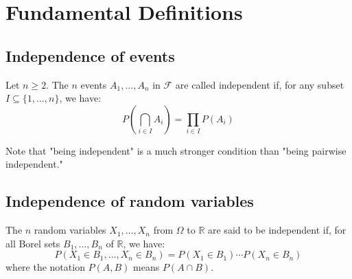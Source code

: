 \section{Fundamental Definitions}%
\subsection{Independence of events}%
\begin{definition}
Let $n \ge 2$. The $n$ events $A_1, \ldots, A_n$ in $\mathcal{F}$ are called independent if, for any subset $I \subseteq \{1, \ldots, n\}$, we have:
\[ P\left(\bigcap_{i \in I} A_i\right) = \prod_{i \in I} P(A_i) \]
\end{definition}%
\begin{remark}
Note that "being independent" is a much stronger condition than "being pairwise independent."
\end{remark}%
\subsection{Independence of random variables}%
\begin{definition}
The $n$ random variables $X_1, \ldots, X_n$ from $\Omega$ to $\mathbb{R}$ are said to be independent if, for all Borel sets $B_1, \ldots, B_n$ of $\mathbb{R}$, we have:
\[ P(X_1 \in B_1, \ldots, X_n \in B_n) = P(X_1 \in B_1) \cdots P(X_n \in B_n) \]
where the notation $P(A, B)$ means $P(A \cap B)$.
\end{definition}%
